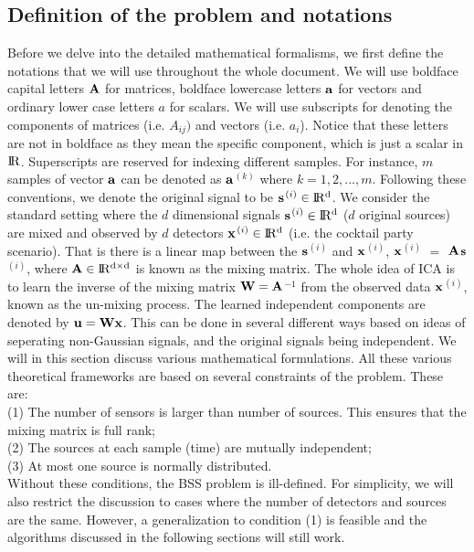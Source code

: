 \documentclass[aps,prl,preprint,superscriptaddress]{revtex4-2}
\begin{document}
\subsection{Definition of the problem and notations}
Before we delve into the detailed mathematical formalisms, we first define the notations that we will use throughout the whole document. We will use boldface capital letters $\bf{A}$ for matrices, boldface lowercase letters $\bf{a}$ for vectors and ordinary lower case letters $a$ for scalars. We will use subscripts for denoting the components of matrices (i.e. $A_{ij})$ and vectors (i.e. $a_{i}$). Notice that these letters are not in boldface as they mean the specific component, which is just a scalar in $ \rm I\!R$. Superscripts are reserved for indexing different samples. For instance, $m$ samples of vector $\bf{a}$ can be denoted as $\bf{a}$$^{(k)}$ where $k = 1, 2, ..., m$. Following these conventions, we denote the original signal to be $\bf{s}$$^{(i)} \in \rm I\!R^{d}$. We consider the standard setting where the $d$ dimensional signals $\bf{s}$$^{(i)} \in \rm I\!R^{d}$ ($d$ original sources) are mixed and observed by $d$ detectors $\bf{x}$$^{(i)} \in \rm I\!R^{d}$ (i.e. the cocktail party scenario). That is there is a linear map between the $\bf{s}$$^{(i)}$ and $\bf{x}$$^{(i)}$, $\bf{x}$$^{(i)}$ $=$ $\bf{A}$$\bf{s}$$^{(i)}$, where $\bf{A} \in \rm I\!R^{d\times d}$ is known as the mixing matrix. The whole idea of ICA is to learn the inverse of the mixing matrix $\bf{W} = \bf{A}$$^{-1}$ from the observed data $\bf{x}$$^{(i)}$, known as the un-mixing process. The learned independent components are denoted by $\bf{u} = \bf{W}\bf{x}$. This can be done in several different ways based on ideas of seperating non-Gaussian signals, and the original signals being independent. We will in this section discuss various mathematical formulations. All these various theoretical frameworks are based on several constraints of the problem. These are:\\
(1) The number of sensors is larger than number of sources. This ensures that the mixing matrix is full rank; \\
(2) The sources at each sample (time) are mutually independent; \\
(3) At most one source is normally distributed. \\
Without these conditions, the BSS problem is ill-defined. For simplicity, we will also restrict the discussion to cases where the number of detectors and sources are the same. However, a generalization to condition (1) is feasible and the algorithms discussed in the following sections will still work.
\end{document}
